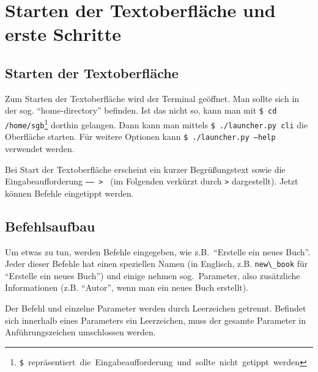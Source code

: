 


\newcommand{\command}[1]{\mbox{\texttt{#1}}}



\maketitle
\newpage

\tableofcontents
\newpage

\section{Starten der Textoberfläche und erste Schritte}
\label{sec:launch_and_start}

\subsection{Starten der Textoberfläche}
\label{subsec:launch_and_start:launch}

Zum Starten der Textoberfläche wird der Terminal geöffnet. Man sollte sich in der sog. ``home-directory'' befinden. Ist das nicht so, kann man mit \mbox{\command{\$ cd /home/sgb}\footnote{\texttt{\$} repräsentiert die Eingabeaufforderung und sollte nicht getippt werden}} dorthin gelangen. Dann kann man mittels \command{\$ ./launcher.py cli} die Oberfläche starten. Für weitere Optionen kann \command{\$ ./launcher.py --help} verwendet werden.

Bei Start der Textoberfläche erscheint ein kurzer Begrü\ss ungstext sowie die Eingabeaufforderung \command{----- > } (im Folgenden verkürzt durch \texttt{>} dargestellt). Jetzt können Befehle eingetippt werden.

\subsection{Befehlsaufbau}
\label{subsec:launch_and_start:command_syntax_intro}

Um etwas zu tun, werden Befehle eingegeben, wie z.B.~``Erstelle ein neues Buch''. Jeder dieser Befehle hat einen speziellen Namen (in Englisch, z.B. \verb|new\_book| für ``Erstelle ein neues Buch'') und einige nehmen sog.~Parameter, also zusätzliche Informationen (z.B. ``Autor'', wenn man ein neues Buch erstellt).

Der Befehl und einzelne Parameter werden durch Leerzeichen getrennt. Befindet sich innerhalb eines Parameters ein Leerzeichen, muss der gesamte Parameter in Anführungszeichen umschlossen werden.

